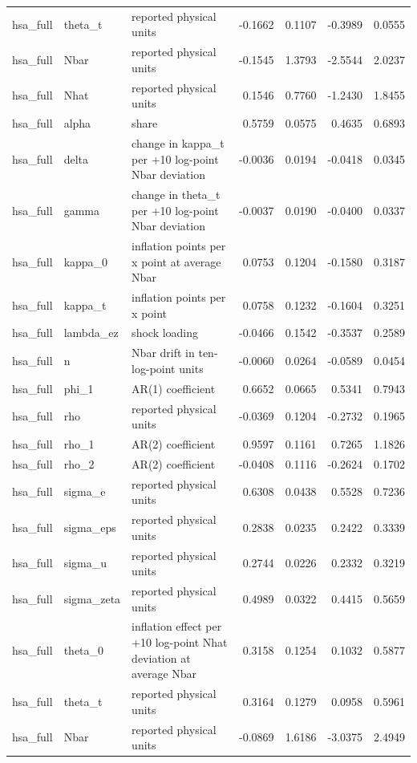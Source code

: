 \begin{tabular}{lllrrrr}
hsa\_full & theta\_t & reported physical units & -0.1662 & 0.1107 & -0.3989 & 0.0555 \\
hsa\_full & Nbar & reported physical units & -0.1545 & 1.3793 & -2.5544 & 2.0237 \\
hsa\_full & Nhat & reported physical units & 0.1546 & 0.7760 & -1.2430 & 1.8455 \\
hsa\_full & alpha & share & 0.5759 & 0.0575 & 0.4635 & 0.6893 \\
hsa\_full & delta & change in kappa\_t per +10 log-point Nbar deviation & -0.0036 & 0.0194 & -0.0418 & 0.0345 \\
hsa\_full & gamma & change in theta\_t per +10 log-point Nbar deviation & -0.0037 & 0.0190 & -0.0400 & 0.0337 \\
hsa\_full & kappa\_0 & inflation points per x point at average Nbar & 0.0753 & 0.1204 & -0.1580 & 0.3187 \\
hsa\_full & kappa\_t & inflation points per x point & 0.0758 & 0.1232 & -0.1604 & 0.3251 \\
hsa\_full & lambda\_ez & shock loading & -0.0466 & 0.1542 & -0.3537 & 0.2589 \\
hsa\_full & n & Nbar drift in ten-log-point units & -0.0060 & 0.0264 & -0.0589 & 0.0454 \\
hsa\_full & phi\_1 & AR(1) coefficient & 0.6652 & 0.0665 & 0.5341 & 0.7943 \\
hsa\_full & rho & reported physical units & -0.0369 & 0.1204 & -0.2732 & 0.1965 \\
hsa\_full & rho\_1 & AR(2) coefficient & 0.9597 & 0.1161 & 0.7265 & 1.1826 \\
hsa\_full & rho\_2 & AR(2) coefficient & -0.0408 & 0.1116 & -0.2624 & 0.1702 \\
hsa\_full & sigma\_e & reported physical units & 0.6308 & 0.0438 & 0.5528 & 0.7236 \\
hsa\_full & sigma\_eps & reported physical units & 0.2838 & 0.0235 & 0.2422 & 0.3339 \\
hsa\_full & sigma\_u & reported physical units & 0.2744 & 0.0226 & 0.2332 & 0.3219 \\
hsa\_full & sigma\_zeta & reported physical units & 0.4989 & 0.0322 & 0.4415 & 0.5659 \\
hsa\_full & theta\_0 & inflation effect per +10 log-point Nhat deviation at average Nbar & 0.3158 & 0.1254 & 0.1032 & 0.5877 \\
hsa\_full & theta\_t & reported physical units & 0.3164 & 0.1279 & 0.0958 & 0.5961 \\
hsa\_full & Nbar & reported physical units & -0.0869 & 1.6186 & -3.0375 & 2.4949 \\

\end{tabular}
